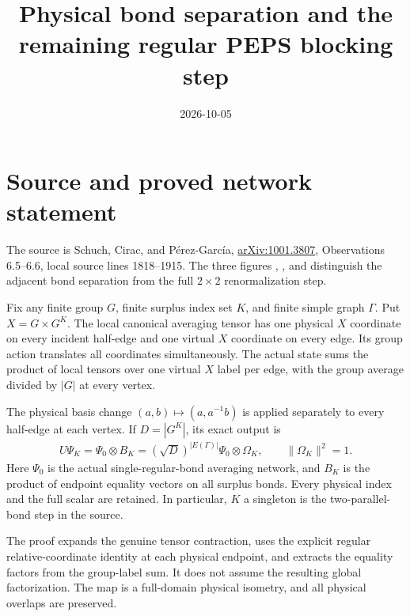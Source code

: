 \documentclass{article}
\title{Physical bond separation and the remaining regular PEPS blocking step}
\author{}
\date{2026-10-05}
\begin{document}
\maketitle
{}

\section{Source and proved network statement}
The source is Schuch, Cirac, and P\'erez-Garc\'ia,
\href{https://arxiv.org/abs/1001.3807}{arXiv:1001.3807},
Observations 6.5--6.6, local source lines 1818--1915. The three figures
, , and
 distinguish the adjacent bond separation
from the full $2\times2$ renormalization step.

Fix any finite group $G$, finite surplus index set $K$, and finite simple
graph $\Gamma$. Put $X=G\times G^K$. The local canonical averaging tensor
has one physical $X$ coordinate on every incident half-edge and one virtual
$X$ coordinate on every edge. Its group action translates all coordinates
simultaneously. The actual state sums the product of local tensors over
one virtual $X$ label per edge, with the group average divided by $|G|$
at every vertex.

The physical basis change $(a,b)\mapsto(a,a^{-1}b)$ is applied separately
to every half-edge at each vertex. If $D=|G^K|$, its exact output is
\begin{align}
 U\Psi_K=\Psi_0\otimes B_K
       =(\sqrt D)^{|E(\Gamma)|}\Psi_0\otimes\Omega_K,
 \qquad \|\Omega_K\|^2=1.
\end{align}
Here $\Psi_0$ is the actual single-regular-bond averaging network, and
$B_K$ is the product of endpoint equality vectors on all surplus bonds.
Every physical index and the full scalar are retained. In particular,
$K$ a singleton is the two-parallel-bond step in the source.

The proof expands the genuine tensor contraction, uses the explicit
regular relative-coordinate identity at each physical endpoint, and
extracts the equality factors from the group-label sum. It does not
assume the resulting global factorization. The map is a full-domain
physical isometry, and all physical overlaps are preserved.
\end{document}
